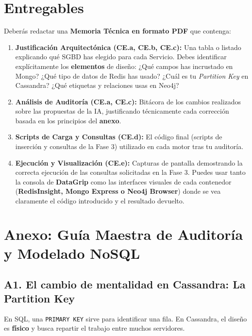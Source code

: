 \documentclass[12pt,a4paper]{article}
\begin{document}
\section{Entregables}
Deberás redactar una \textbf{Memoria Técnica en formato PDF} que contenga:
\begin{enumerate}
    \item \textbf{Justificación Arquitectónica (CE.a, CE.b, CE.c):} Una tabla o listado explicando qué SGBD has elegido para cada Servicio. Debes identificar explícitamente los \textbf{elementos} de diseño: ¿Qué campos has incrustado en Mongo? ¿Qué tipo de datos de Redis has usado? ¿Cuál es tu \textit{Partition Key} en Cassandra? ¿Qué etiquetas y relaciones usas en Neo4j?
    \item \textbf{Análisis de Auditoría (CE.a, CE.c):} Bitácora de los cambios realizados sobre las propuestas de la IA, justificando técnicamente cada corrección basada en los principios del \textbf{anexo}.
    \item \textbf{Scripts de Carga y Consultas (CE.d):} El código final (scripts de inserción y consultas de la Fase 3) utilizado en cada motor tras tu auditoría.
    \item \textbf{Ejecución y Visualización (CE.e):} Capturas de pantalla demostrando la correcta ejecución de las consultas solicitadas en la Fase 3. Puedes usar tanto la consola de \textbf{DataGrip} como las interfaces visuales de cada contenedor (\textbf{RedisInsight, Mongo Express o Neo4j Browser}) donde se vea claramente el código introducido y el resultado devuelto.
\end{enumerate}

\appendix
\section*{Anexo: Guía Maestra de Auditoría y Modelado NoSQL}

\subsection*{A1. El cambio de mentalidad en Cassandra: La Partition Key}
En SQL, una \texttt{PRIMARY KEY} sirve para identificar una fila. En Cassandra, el diseño es \textbf{físico} y busca repartir el trabajo entre muchos servidores.
\end{document}

